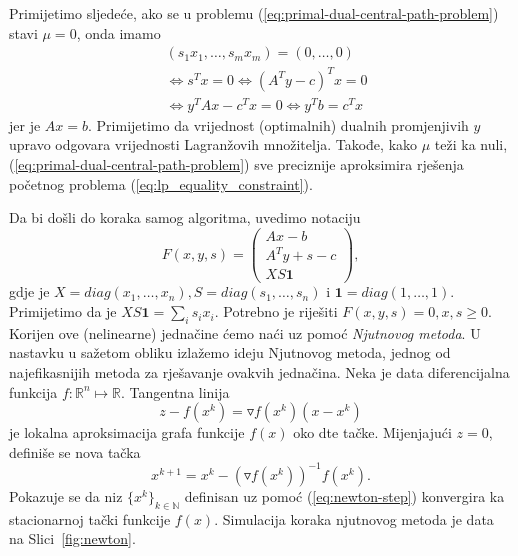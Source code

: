 \documentclass[a4paper, utf8, 11pt, colorlinks]{book}
\begin{document}
Primijetimo sljedeće, ako se u problemu (\ref{eq:primal-dual-central-path-problem}) stavi $\mu = 0$, onda imamo 
\begin{align*}
	&(s_1 x_1, \ldots, s_m x_m) = (0, \ldots, 0) \\
	&\Longleftrightarrow s^T x = 0  \Longleftrightarrow (A^T y - c)^T x = 0 \\
	&\Longleftrightarrow y^T A x - c^T x = 0 \Longleftrightarrow y^T b = c^Tx
\end{align*}
jer je $Ax = b$. Primijetimo da   vrijednost (optimalnih) dualnih promjenjivih $y$ upravo odgovara vrijednosti Lagranžovih množitelja. Takođe, kako $\mu$ teži ka nuli,   (\ref{eq:primal-dual-central-path-problem}) sve preciznije aproksimira rješenja početnog problema (\ref{eq:lp_equality_constraint}). 

Da bi došli do koraka samog algoritma, uvedimo notaciju 
$$ F(x, y, s) = \left (\begin{array}{c}
	Ax - b           \\
	A^T y + s - c     \\
	X S \textbf{1}                   
\end{array} \right ),$$
gdje je  $X = diag (x_1, \ldots, x_n ), S = diag(s_1,\ldots, s_n)$ i 
$\textbf{1} = diag (1,\ldots, 1)$. Primijetimo da je $X S \textbf{1}=\sum_{i} s_i x_i$. 
Potrebno je riješiti $F(x, y, s ) = 0, x,s \geq 0$. Korijen ove (nelinearne) jednačine ćemo naći uz pomoć \emph{Njutnovog metoda}. U nastavku u sažetom obliku izlažemo ideju Njutnovog metoda, jednog od najefikasnijih metoda za rješavanje ovakvih jednačina. Neka je data diferencijalna funkcija $f: \mathbb{R}^n \mapsto \mathbb{R}$.   Tangentna linija 
$$z - f(x^k) = \triangledown f(x^k) (x - x^k) $$
je lokalna aproksimacija grafa funkcije $f(x)$ oko dte tačke. Mijenjajući $z=0$, definiše se nova tačka 
\begin{equation} \label{eq:newton-step}
	x^{k+1} = x^k - (\triangledown f(x^k))^{-1} f(x^k).
\end{equation}
Pokazuje se da niz $\{x^k\}_{k \in \mathbb{N}}$ definisan uz pomoć (\ref{eq:newton-step}) konvergira ka stacionarnoj tački funkcije $f(x)$. Simulacija koraka njutnovog metoda je data na Slici~\ref{fig:newton}. 
\end{document}
